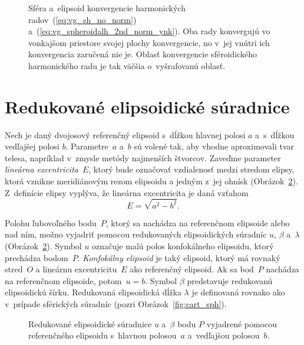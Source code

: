 \documentclass[a4paper,12pt]{book}
\begin{document}
\begin{figure}
\centering

\caption{Sféra a~elipsoid konvergencie harmonických 
radov~(\ref{eq:vg_sh_no_norm}) a~(\ref{eq:vg_spheroidalh_2nd_norm_ynk}).  Oba 
rady konvergujú vo vonkajšom priestore svojej plochy konvergencie, no v~jej 
vnútri ich konvergencia zaručená nie je.  Oblasť konvergencie sféroidického 
harmonického radu je tak väčšia o~vyšrafovanú oblasť.}
\label{fig:spheroidal_harmonics_convergence}
\end{figure}


\section{Redukované elipsoidické súradnice}
\label{sec:reduced_ell_coords}

Nech je daný dvojosový referenčný elipsoid s~dĺžkou hlavnej polosi $a$ 
a~s~dĺžkou vedľajšej polosi $b$.  Parametre~$a$ a~$b$ sú volené tak, aby vhodne 
aproximovali tvar telesa, napríklad v~zmysle metódy najmenších štvorcov.  
Zaveďme parameter \emph{lineárna excentricita}~$E$, ktorý bude označovať 
vzdialenosť medzi stredom elipsy, ktorá vznikne meridiánovým rezom elipsoidu 
a jedným z~jej ohnísk (Obrázok~\ref{fig:reduced_ell_coords}).  Z~definície 
elipsy vyplýva, že lineárna excentricita je daná vzťahom
%
\begin{equation}
\label{eq:linear_eccentricity}
E = \sqrt{a^2 - b^2}{.}
\end{equation}

Polohu ľubovoľného bodu~$P$, ktorý sa nachádza na referenčnom elipsoide alebo 
nad ním, možno vyjadriť pomocou redukovaných elipsoidických súradníc $u$, 
$\beta$ a~$\lambda$ (Obrázok~\ref{fig:reduced_ell_coords}).  Symbol $u$ 
označuje malú polos konfokálneho elipsoidu, ktorý prechádza bodom~$P$.  
\emph{Konfokálny elipsoid} je taký elipsoid, ktorý má rovnaký stred~$O$ 
a lineárnu excentricitu~$E$ ako referenčný elipsoid.  Ak sa bod~$P$ nachádza na 
referenčnom elipsoide, potom~$u = b$.  Symbol $\beta$ predstavuje redukovanú 
elipsoidickú šírku.  Redukovaná elipsoidická dĺžka $\lambda$ je definovaná 
rovnako ako v~prípade sférických súradníc (pozri Obrázok~\ref{fig:cart_sph}).

\begin{figure}
\centering

\caption{Redukované elipsoidické súradnice $u$ a~$\beta$ bodu $P$ vyjadrené 
pomocou referenčného elipsoidu s~hlavnou polosou~$a$ a~vedľajšou polosou~$b$.}
\label{fig:reduced_ell_coords}
\end{figure}
\end{document}
